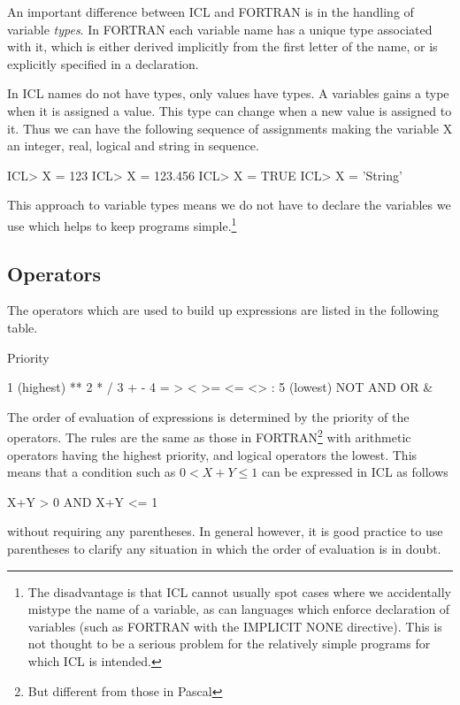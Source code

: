 \documentclass[twoside,11pt,nolof,chapters]{starlink}
\begin{document}
An important difference between ICL and FORTRAN is in the handling
of variable \emph{types}. In FORTRAN each variable name has a unique type
associated with it, which is either derived implicitly from the first
letter of the name, or is explicitly specified in a declaration.

In ICL names do not have types, only values have types. A variables gains
a type when it is assigned a value. This type can change when a new value
is assigned to it. Thus we can have the following sequence of assignments
making the variable X an integer, real, logical and string in sequence.
\begin{terminalv}
    ICL> X = 123
    ICL> X = 123.456
    ICL> X = TRUE
    ICL> X = 'String'
\end{terminalv}
This approach to variable types means we do not have to declare the
variables we use which helps to keep programs
simple.\footnote{The disadvantage is that ICL cannot usually spot cases
where we accidentally mistype the name of a variable, as can languages which
enforce declaration of variables (such as FORTRAN with the IMPLICIT NONE
directive). This is not thought to be a serious problem for the relatively
simple programs for which ICL is intended.}
\subsection{Operators}
The operators which are used to build up expressions are listed in the following
table.
\begin{terminalv}
Priority

   1 (highest)              **
   2                        *   /
   3                        +   -
   4                        =   >   <   >=  <=  <>  :
   5 (lowest)               NOT   AND   OR   &
\end{terminalv}
The order of evaluation of expressions is determined by the priority
of the operators. The rules are the same as those in FORTRAN\footnote
{But different from those in Pascal} with arithmetic operators having
the highest priority, and logical operators the lowest. This means that
a condition such as \( 0 < X+Y \leq 1 \) can be expressed in ICL as follows
\begin{terminalv}
    X+Y > 0  AND  X+Y <= 1
\end{terminalv}
without requiring any parentheses.
In general however, it is good practice
to use parentheses to clarify any situation in which the order of evaluation
is in doubt.
\end{document}
